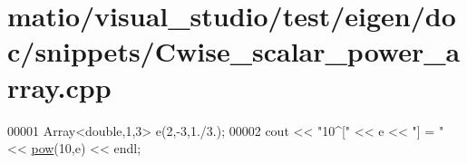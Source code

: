 \hypertarget{matio_2visual__studio_2test_2eigen_2doc_2snippets_2_cwise__scalar__power__array_8cpp_source}{}\section{matio/visual\+\_\+studio/test/eigen/doc/snippets/\+Cwise\+\_\+scalar\+\_\+power\+\_\+array.cpp}
\label{matio_2visual__studio_2test_2eigen_2doc_2snippets_2_cwise__scalar__power__array_8cpp_source}

\begin{DoxyCode}
00001 Array<double,1,3> e(2,-3,1./3.);
00002 cout << \textcolor{stringliteral}{"10^["} << e << \textcolor{stringliteral}{"] = "} << \hyperlink{group___core___module_ab6dc101d82e8228a19a8840e3a29c1c9}{pow}(10,e) << endl;
\end{DoxyCode}
